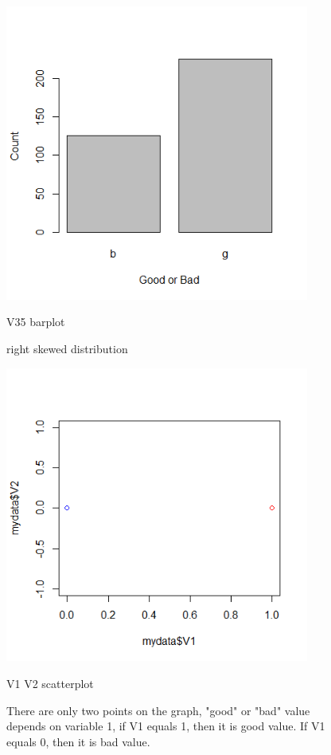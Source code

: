 \documentclass{article}
\begin{document}
\begin{enumerate}
\begin{figure}
  \includegraphics[width=100mm, scale = 0.5]{barplotV35.png}
  \caption{V35 barplot}
  \caption*{right skewed distribution}
\end{figure}
\begin{figure}
  \includegraphics[width=100mm, scale = 0.5]{scatterplotV1V2.png}
  \caption{V1 V2 scatterplot}
  \caption*{There are only two points on the graph, "good" or "bad" value depends on variable 1, if V1 equals 1, then it is good value. If V1 equals 0, then it is bad value.}
\end{figure}
\begin{figure}

\end{figure}
\end{enumerate}
\end{document}
